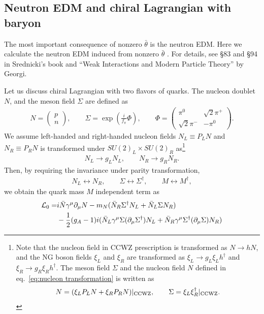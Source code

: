 \documentclass[11pt,a4paper]{article}
\begin{document}
\subsection{Neutron EDM and chiral Lagrangian with baryon}\label{sec:neutron EDM in chpt}
The most important consequence of nonzero $\bar\theta$ is the neutron EDM.
Here we calculate the neutron EDM induced from nonzero $\bar\theta$ \cite{Crewther:1979pi,Pich:1991fq}.
For details, see \S 83 and \S 94 in Srednicki's book and ``Weak Interactions and Modern Particle Theory'' by Georgi.

Let us discuss chiral Lagrangian with two flavors of quarks. The nucleon doublet $N$, and the meson field $\Sigma$ are defined as
\begin{align}
    N = \left(\begin{array}{c} p \\ n \end{array}\right), \qquad
    \Sigma = \exp\left( \frac{i}{f_\pi} \Phi\right), \qquad
    \Phi = \left(\begin{array}{cc} \pi^0 & \sqrt{2}\pi^+ \\ \sqrt{2}\pi^- & -\pi^0 \end{array}\right).
\end{align}
We assume left-handed and right-handed nucleon fields $N_L \equiv P_L N$ and $N_R \equiv P_R N$ is transformed under $SU(2)_L \times SU(2)_R$ as\footnote{
    Note that the nucleon field in CCWZ prescription \cite{Coleman:1969sm, Callan:1969sn} is transformed as $N \to h N$, and the NG boson fields $\xi_L$ and $\xi_R$ are transformed as
    $\xi_L \to g_L \xi_L h^\dagger$ and $\xi_R \to g_R \xi_R h^\dagger$.
    The meson field $\Sigma$ and the nucleon field $N$ defined in eq.~\eqref{eq:nucleon transformation} is written as
    \begin{align}
        N = (\xi_L P_L N + \xi_R P_R N)|_{\rm CCWZ}, \qquad
        \Sigma = \xi_L \xi_R^\dagger|_{\rm CCWZ}.
    \end{align}
}
\begin{align}
    N_L \to g_L N_L, \qquad
    N_R \to g_R N_R. \label{eq:nucleon transformation}
\end{align}
Then, by requiring the invariance under parity transformation,
\begin{align}
    N_L \leftrightarrow N_R, \qquad
    \Sigma \leftrightarrow \Sigma^\dagger, \qquad
    M \leftrightarrow M^\dagger,
\end{align}
we obtain the quark mass $M$ independent term as
\begin{align}
    {\cal L}_0 =& i \bar N \gamma^\mu \partial_\mu N - m_N (\bar N_R \Sigma^\dagger N_L + \bar N_L \Sigma N_R) \nonumber\\
    &- \frac{1}{2} (g_A-1) i (\bar N_L \gamma^\mu \Sigma (\partial_\mu \Sigma^\dagger) N_L + \bar N_R \gamma^\mu \Sigma^\dagger (\partial_\mu \Sigma) N_R) \label{eq:chpt baryon LO}
\end{align}
\end{document}
